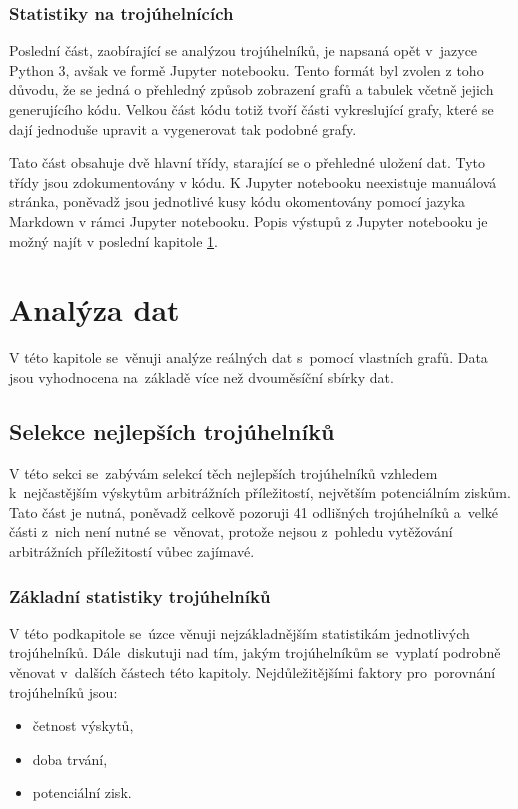 \documentclass[thesis=B,czech]{FITthesis}[2019/03/21]
\begin{document}
\subsection{Statistiky na trojúhelnících}
\label{subsection:statistics}
Poslední část, zaobírající se analýzou trojúhelníků, je napsaná opět v~jazyce Python 3, avšak ve formě Jupyter notebooku. Tento formát byl zvolen z toho důvodu, že se jedná o přehledný způsob zobrazení grafů a tabulek včetně jejich generujícího kódu. Velkou část kódu totiž tvoří části vykreslující grafy, které se dají jednoduše upravit a vygenerovat tak podobné grafy.

Tato část obsahuje dvě hlavní třídy, starající se o přehledné uložení dat. Tyto třídy jsou zdokumentovány v kódu. K Jupyter notebooku neexistuje manuálová stránka, poněvadž jsou jednotlivé kusy kódu okomentovány pomocí jazyka Markdown v rámci Jupyter notebooku. Popis výstupů z Jupyter notebooku je možný najít v poslední kapitole \ref{chapter:analyza_dat}.


\chapter{Analýza dat}
\label{chapter:analyza_dat}
V této kapitole se~věnuji analýze  reálných dat s~pomocí vlastních grafů. Data jsou vyhodnocena na~základě více než dvouměsíční sbírky dat.

\section{Selekce nejlepších trojúhelníků}
V této sekci se~zabývám selekcí těch nejlepších trojúhelníků vzhledem \linebreak k~nejčastějším výskytům arbitrážních příležitostí, největším potenciálním \linebreak ziskům. Tato část je nutná, poněvadž celkově pozoruji 41 odlišných trojúhelníků a~velké části z~nich není nutné se~věnovat, protože nejsou z~pohledu vytěžování arbitrážních příležitostí vůbec zajímavé.

\subsection{Základní statistiky trojúhelníků}
V této podkapitole se~úzce věnuji nejzákladnějším statistikám jednotlivých trojúhelníků. Dále~diskutuji nad tím, jakým trojúhelníkům se~vyplatí podrobně věnovat v~dalších částech této kapitoly. Nejdůležitějšími faktory pro~porovnání trojúhelníků jsou: 
\begin{itemize}
    \item četnost výskytů,
    \item doba trvání,
    \item potenciální zisk.
\end{itemize}
\end{document}
